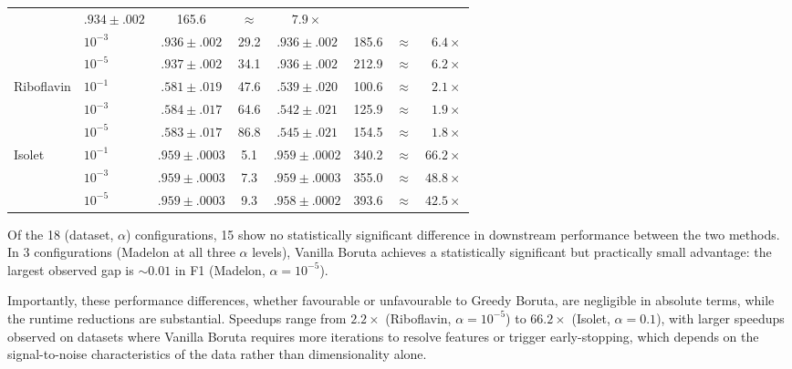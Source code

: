 \documentclass[runningheads]{llncs}
\begin{document}
\begin{table}
\begin{tabular}{ll cc cc c r}
               & $.934 \pm .002$ & 165.6
               & $\approx$ & $7.9\times$ \\
  & $10^{-3}$  & $.936 \pm .002$ & 29.2
               & $.936 \pm .002$ & 185.6
               & $\approx$ & $6.4\times$ \\
  & $10^{-5}$  & $.937 \pm .002$ & 34.1
               & $.936 \pm .002$ & 212.9
               & $\approx$ & $6.2\times$ \\
\midrule
\multirow{3}{*}{Riboflavin}
  & $10^{-1}$  & $.581 \pm .019$ & 47.6
               & $.539 \pm .020$ & 100.6
               & $\approx$ & $2.1\times$ \\
  & $10^{-3}$  & $.584 \pm .017$ & 64.6
               & $.542 \pm .021$ & 125.9
               & $\approx$ & $1.9\times$ \\
  & $10^{-5}$  & $.583 \pm .017$ & 86.8
               & $.545 \pm .021$ & 154.5
               & $\approx$ & $1.8\times$ \\
\midrule
\multirow{3}{*}{Isolet}
  & $10^{-1}$  & $.959 \pm .0003$ & 5.1
               & $.959 \pm .0002$ & 340.2
               & $\approx$ & $66.2\times$ \\
  & $10^{-3}$  & $.959 \pm .0003$ & 7.3
               & $.959 \pm .0003$ & 355.0
               & $\approx$ & $48.8\times$ \\
  & $10^{-5}$  & $.959 \pm .0003$ & 9.3
               & $.958 \pm .0002$ & 393.6
               & $\approx$ & $42.5\times$ \\
\bottomrule
\end{tabular}
\end{table}
 
Of the 18 (dataset, $\alpha$) configurations, 15 show no statistically significant difference in downstream performance between the two methods. In 3 configurations (Madelon at all three $\alpha$ levels), Vanilla Boruta achieves a statistically significant but practically small advantage: the largest observed gap is ${\sim}0.01$ in F1 (Madelon, $\alpha = 10^{-5}$).

Importantly, these performance differences, whether favourable or unfavourable to Greedy Boruta, are negligible in absolute terms, while the runtime reductions are substantial. Speedups range from $2.2\times$ (Riboflavin, $\alpha = 10^{-5}$) to $66.2\times$ (Isolet, $\alpha = 0.1$), with larger speedups observed on datasets where Vanilla Boruta requires more iterations to resolve features or trigger early-stopping, which depends on the signal-to-noise characteristics of the data rather than dimensionality alone. 
\end{document}
